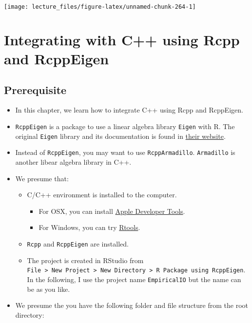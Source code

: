 \documentclass[
]{book}
\providecommand{\tightlist}{%
  \setlength{\itemsep}{0pt}\setlength{\parskip}{0pt}}
\begin{document}
\begin{center}\texttt{[image: lecture\_files/figure-latex/unnamed-chunk-264-1]} \end{center}

\hypertarget{rcpp}{%
\chapter{Integrating with C++ using Rcpp and RcppEigen}\label{rcpp}}

\hypertarget{prerequisite}{%
\section{Prerequisite}\label{prerequisite}}

\begin{itemize}
\tightlist
\item
  In this chapter, we learn how to integrate C++ using Rcpp and RcppEigen.
\item
  \texttt{RcppEigen} is a package to use a linear algebra library \texttt{Eigen} with R. The original \texttt{Eigen} library and its documentation is found in \href{http://eigen.tuxfamily.org/index.php?title=Main_Page}{their website}.
\item
  Instead of \texttt{RcppEigen}, you may want to use \texttt{RcppArmadillo}. \texttt{Armadillo} is another libear algebra library in C++.
\item
  We presume that:

  \begin{itemize}
  \tightlist
  \item
    C/C++ environment is installed to the computer.

    \begin{itemize}
    \tightlist
    \item
      For OSX, you can install \href{https://developer.apple.com/xcode/}{Apple Developer Tools}.
    \item
      For Windows, you can try \href{https://cran.r-project.org/bin/windows/Rtools/}{Rtools}.
    \end{itemize}
  \item
    \texttt{Rcpp} and \texttt{RcppEigen} are installed.
  \item
    The project is created in RStudio from \texttt{File\ \textgreater{}\ New\ Project\ \textgreater{}\ New\ Directory\ \textgreater{}\ R\ Package\ using\ RcppEigen}. In the following, I use the project name \texttt{EmpiricalIO} but the name can be as you like.
  \end{itemize}
\item
  We presume the you have the following folder and file structure from the root directory:


\end{itemize}
\end{document}

